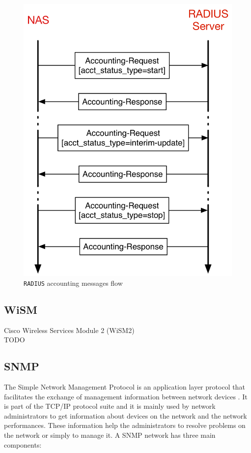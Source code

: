	\begin{figure}[H]
		\begin{center}
			\includegraphics[width=.5\linewidth]{Pictures/chapter2/radius-accounting.png}
			\caption{\texttt{RADIUS} accounting messages flow}
		\end{center}
	\end{figure}


\subsection{WiSM}

Cisco Wireless Services Module 2 (WiSM2)\\
TODO

\subsection{SNMP}

The Simple Network Management Protocol is an application layer protocol that facilitates the exchange of management information between network devices \cite{snmp}. It is part of the TCP/IP protocol suite and it is mainly used by network administrators to get information about devices on the network and the network performances. These information help the administrators to resolve problems on the network or simply to manage it.
A SNMP network has three main components:

